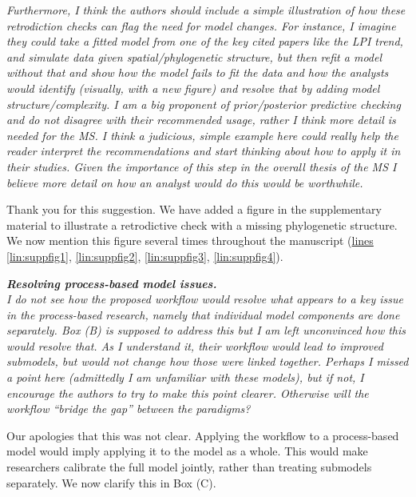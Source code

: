 \documentclass[11pt,letter]{article}
\begin{document}
\begin{mybox}
\emph{Furthermore, I think the authors should include a simple illustration of how these retrodiction checks can flag the need for model changes. For instance, I imagine they could take a fitted model from one of the key cited papers like the LPI trend, and simulate data given spatial/phylogenetic structure, but then refit a model without that and show how the model fails to fit the data and how the analysts would identify (visually, with a new figure) and resolve that by adding model structure/complexity. I am a big proponent of prior/posterior predictive checking and do not disagree with their recommended usage, rather I think more detail is needed for the MS. I think a judicious, simple example here could really help the reader interpret the recommendations and start thinking about how to apply it in their studies. Given the importance of this step in the overall thesis of the MS I believe more detail on how an analyst would do this would be worthwhile.}
\end{mybox}

Thank you for this suggestion. We have added a figure in the supplementary material to illustrate a retrodictive check with a missing phylogenetic structure. We now mention this figure several times throughout the manuscript (\href{file:forecastflows_r1\#lintarget:suppfig1}{lines \ref*{lin:suppfig1}}, \href{file:forecastflows_r1\#lintarget:suppfig2}{\ref*{lin:suppfig2}}, \href{file:forecastflows_r1\#lintarget:suppfig3}{\ref*{lin:suppfig3}}, \href{file:forecastflows_r1\#lintarget:suppfig4}{\ref*{lin:suppfig4}}).

\begin{mybox}
\emph{\textbf{Resolving process-based model issues.}\\
I do not see how the proposed workflow would resolve what appears to a key issue in the process-based research, namely that individual model components are done separately. Box (B) is supposed to address this but I am left unconvinced how this would resolve that. As I understand it, their workflow would lead to improved submodels, but would not change how those were linked together. Perhaps I missed a point here (admittedly I am unfamiliar with these models), but if not, I encourage the authors to try to make this point clearer. Otherwise will the workflow “bridge the gap” between the paradigms?}
\end{mybox}

Our apologies that this was not clear. Applying the workflow to a process-based model would imply applying it to the model as a whole. This would make researchers calibrate the full model jointly, rather than treating submodels separately. We now clarify this in Box (C).
\end{document}
